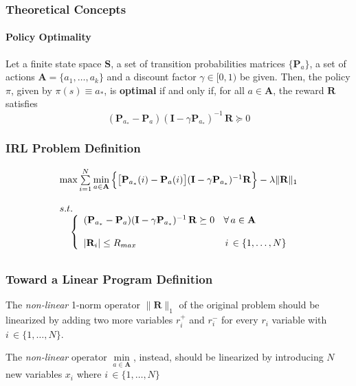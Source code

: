 \begin{frame}
	\frametitle{Theoretical Concepts}
	\framesubtitle{Policy Optimality}
	
	\Large
	
	Let a finite state space $ \mathbf{S} $, a set of transition probabilities matrices $ \{
	\mathbf{P}_{a} \} $, a set of actions $ \mathbf{A} = \{a_1,\ldots,a_k\} $ and a discount
	factor $ \gamma \in [0,1) $ be given. Then, the policy $ \pi $, given by $ \pi(s) \equiv a_*
	$, is \textbf{optimal} if and only if, for all $ a \in \mathbf{A} $, the reward $ \mathbf{R}
	$ satisfies\\
	
	\begin{equation*}
		(\mathbf{P}_{a_*} - \mathbf{P}_a)(\mathbf{I} - \gamma \mathbf{P}_{a_*})^{-1} \,
		\mathbf{R} \succeq 0
	\end{equation*}
\end{frame}

\begin{frame}
	\frametitle{IRL Problem Definition}
	
	\Large
	
	\begin{equation*}
		\begin{array}{ll}
			\max \sum\limits_{i=1}^N \min\limits_{a \in \mathbf{A}} \Big
			\{ \big [ \mathbf{P}_{a_*}(i) - \mathbf{P}_a(i) \big ] ( \mathbf{I} - \gamma
			\mathbf{P}_{a_*})^{-1} \mathbf{R} \Big \} - \lambda \| \mathbf{R} \|_1 \\ \\
			s.t. \\ \;\;\;\;
			\left \{
				\begin{array}{ll}
					(\mathbf{P}_{a_*} - \mathbf{P}_a)(\mathbf{I} - \gamma
					\mathbf{P}_{a_*})^{-1} \, \mathbf{R} \succeq 0 \;\,\,\,\, \forall \, a \in
					\mathbf{A} \\ \\
					| \mathbf{R}_i | \leq R_{max} \;\;\;\;\;\;\;\;\;\;\;\;\;\;\;\;\;\;\;\;\;\
					\;\;\;\;\;\;\;\;\,\,\,\,\, i \, \in \{ 1, \ldots, N \}
				\end{array}
			\right.
			\vspace{0.2cm}
		\end{array}
	\end{equation*}
\end{frame}

\begin{frame}
	\frametitle{Toward a Linear Program Definition}
	
	\Large
	
	\vspace{0.4cm}
	
	The \emph{non-linear} 1-norm operator $ \| \mathbf{R} \|_1 $ of the original problem should
	be linearized by adding two more variables $ r_i^+ $ and $ r_i^- $ for every $ r_i $
	variable with $ i \, \in \{ 1, \ldots, N \} $.
	
	\vspace{0.8cm}
	
	The \emph{non-linear} operator $ \min\limits_{a \in \mathbf{A}} $, instead, should be
	linearized by introducing $ N $ new variables $ x_i $ where $ i \, \in \{ 1, \ldots, N \} $
\end{frame}

